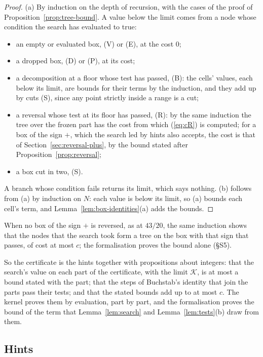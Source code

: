 \documentclass[11pt]{article}
\theoremstyle{definition}
\begin{document}
\begin{proof}
(a) By induction on the depth of recursion, with the cases of the proof of Proposition~\ref{prop:tree-bound}. A value
below the limit comes from a node whose condition the search has evaluated to true:
\begin{itemize}
\item an empty or evaluated box, (V) or (E), at the cost $0$;
\item a dropped box, (D) or (P), at its cost;
\item a decomposition at a floor whose test has passed, (B): the cells' values, each below its limit, are bounds for
  their terms by the induction, and they add up by cuts (S), since any point strictly inside a range is a cut;
\item a reversal whose test at its floor has passed, (R): by the same induction the tree over the frozen part has the
  cost from which (\ref{eq:cR}) is computed; for a box of the sign $+$, which the search led by hints also accepts,
  the cost is that of Section~\ref{sec:reversal-plus}, by the bound stated after Proposition~\ref{prop:reversal};
\item a box cut in two, (S).
\end{itemize}
A branch whose condition fails returns its limit, which says nothing. (b) follows from (a) by induction on $N$: each
value is below its limit, so (a) bounds each
cell's term, and Lemma~\ref{lem:box-identities}(a) adds the bounds.
\end{proof}

When no box of the sign $+$ is reversed, as at $43/20$, the same induction shows that the nodes that the search took
form a tree on the box with that sign that passes, of cost at most $c$; the formalisation proves the bound alone
(\S S5).

So the certificate is the hints together with propositions about integers: that the search's value on each part of
the certificate, with the limit $\mathcal K$, is at most a bound stated with the part; that the steps of Buchstab's
identity that join the parts pass their tests; and that the stated bounds add up to at most $c$. The kernel proves
them by evaluation, part by part, and the formalisation proves the bound of the term that Lemma~\ref{lem:search} and
Lemma~\ref{lem:tests}(b) draw from them.

\subsection{Hints}\label{sec:hints}
\end{document}
